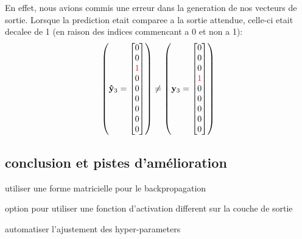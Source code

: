 \documentclass[11pt]{article}
\begin{document}
En effet, nous avions commis une erreur dans la generation de nos vecteurs de
sortie. Lorsque la prediction etait comparee a la sortie attendue, celle-ci etait
decalee de 1 (en raison des indices commencant a 0 et non a 1):
\begin{equation}
	\left (
	{\bf \hat y}_3 =
	\begin{bmatrix}
		0 \\
		0 \\
		{\color{red} 1 }\\
		0 \\
		0 \\
		0 \\
		0 \\
		0 \\
		0 \\
	\end{bmatrix}
	\right )
	\ne
	\left (
	{\bf y}_3 =
	\begin{bmatrix}
		0 \\
		0 \\
		0 \\
		{\color{red} 1 }\\
		0 \\
		0 \\
		0 \\
		0 \\
		0 \\
	\end{bmatrix}
	\right )
\end{equation}

\subsection{conclusion et pistes d'am\'elioration}
utiliser une forme matricielle pour le backpropagation

option pour utiliser une fonction d'activation different sur la couche de sortie

automatiser l'ajustement des hyper-parameters

\appendix
\newpage
\end{document}
